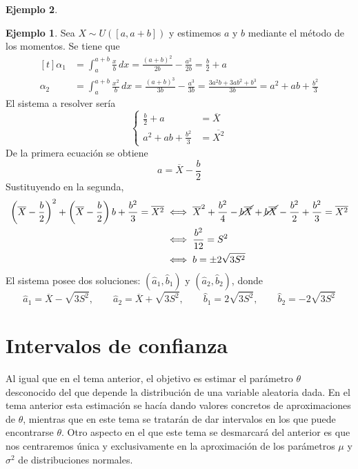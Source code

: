 \documentclass[11pt]{report}
\theoremstyle{definition}
\newtheorem{example}{Ejemplo}
\begin{document}
\begin{example}
\begin{example}
Sea $X \sim U([a,a+b])$ y estimemos $a$ y $b$ mediante el método de los momentos. Se tiene que
\[
\begin{aligned}[t]
\alpha_1 &= \int_a^{a+b}\frac{x}{b} \, dx = \frac{(a+b)^2}{2b}-\frac{a^2}{2b} = \frac{b}{2}+a \\ 
\alpha_2 &= \int_a^{a+b}\frac{x^2}{b} \, dx = \frac{(a+b)^3}{3b}-\frac{a^3}{3b} = \frac{3a^2b+3ab^2+b^3}{3b} = a^2+ab+\frac{b^2}{3}
\end{aligned}
\]
El sistema a resolver sería
\[\left\{\begin{alignedat}{1}
    \frac{b}{2}+a &= \overline{X} \\
    a^2+ab+\frac{b^2}{3} &= \overline{X^2}
    \end{alignedat}\right.\]
De la primera ecuación se obtiene
\[a = \overline{X}-\frac{b}{2}\]
Sustituyendo en la segunda,
\[
\begin{aligned}[t]
\left( \overline{X}-\frac{b}{2}\right)^2+ \left(\overline{X}-\frac{b}{2}\right)b+\frac{b^2}{3} = \overline{X^2} &\iff \overline{X}^2+\frac{b^2}{4}-\cancel{b\overline{X}}+\cancel{b\overline{X}}-\frac{b^2}{2}+\frac{b^2}{3}=\overline{X^2} \\
&\iff \frac{b^2}{12} = S^2 \\
&\iff b =\pm 2\sqrt{3S^2}
\end{aligned}
\]
El sistema posee dos soluciones: $\displaystyle (\hat{a}_1,\hat{b}_1)$ y $\displaystyle (\hat{a}_2, \hat{b}_2)$, donde
\[\hat{a}_1 = \overline{X}-\sqrt{3S^2}, \qquad \hat{a}_2 = \overline{X}+\sqrt{3S^2}, \qquad \hat{b}_1 = 2\sqrt{3S^2}, \qquad \hat{b}_2 = -2\sqrt{3S^2}\]
\end{example}



\end{example}

\chapter{Intervalos de confianza}

Al igual que en el tema anterior, el objetivo es estimar el parámetro $\theta$ desconocido del que depende la distribución de una variable aleatoria dada. En el tema anterior esta estimación se hacía dando valores concretos de aproximaciones de $\theta$, mientras que en este tema se tratarán de dar intervalos en los que puede encontrarse $\theta$. Otro aspecto en el que este tema se desmarcará del anterior es que nos centraremos única y exclusivamente en la aproximación de los parámetros $\mu$ y $\sigma^2$ de distribuciones normales.
\end{document}
